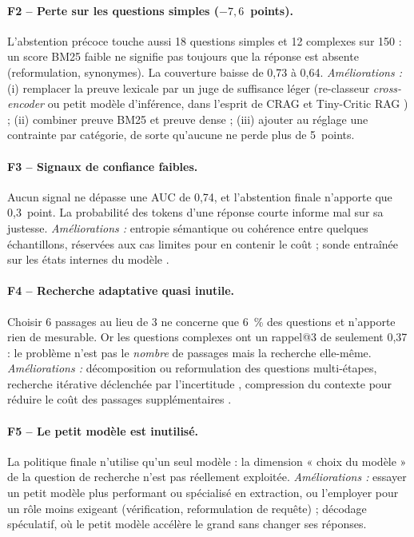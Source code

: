 \documentclass[11pt,a4paper]{article}
\begin{document}
\paragraph{F2 -- Perte sur les questions simples ($-7{,}6$~points).} L'abstention précoce touche aussi
18 questions simples et 12 complexes sur 150 : un score BM25 faible ne signifie pas toujours que la
réponse est absente (reformulation, synonymes). La couverture baisse de 0,73 à 0,64.
\emph{Améliorations :} (i) remplacer la preuve lexicale par un juge de suffisance léger (re-classeur
\emph{cross-encoder} ou petit modèle d'inférence, dans l'esprit de CRAG \citep{yan2024crag} et
Tiny-Critic RAG \citep{wu2026tinycritic}) ; (ii) combiner preuve BM25 et preuve dense ; (iii) ajouter au
réglage une contrainte par catégorie, de sorte qu'aucune ne perde plus de 5~points.

\paragraph{F3 -- Signaux de confiance faibles.} Aucun signal ne dépasse une AUC de 0,74, et l'abstention
finale n'apporte que 0,3~point. La probabilité des tokens d'une réponse courte informe mal sur sa
justesse. \emph{Améliorations :} entropie sémantique \citep{kuhn2023semantic} ou cohérence entre
quelques échantillons, réservées aux cas limites pour en contenir le coût ; sonde entraînée sur les
états internes du modèle \citep{kadavath2022know}.

\paragraph{F4 -- Recherche adaptative quasi inutile.} Choisir 6 passages au lieu de 3 ne concerne que
6~\% des questions et n'apporte rien de mesurable. Or les questions complexes ont un rappel@3 de
seulement 0,37 : le problème n'est pas le \emph{nombre} de passages mais la recherche elle-même.
\emph{Améliorations :} décomposition ou reformulation des questions multi-étapes, recherche itérative
déclenchée par l'incertitude \citep{jiang2023flare,su2024dragin}, compression du contexte pour réduire
le coût des passages supplémentaires \citep{arefeen2024leancontext}.

\paragraph{F5 -- Le petit modèle est inutilisé.} La politique finale n'utilise qu'un seul modèle : la
dimension « choix du modèle » de la question de recherche n'est pas réellement exploitée.
\emph{Améliorations :} essayer un petit modèle plus performant ou spécialisé en extraction, ou l'employer
pour un rôle moins exigeant (vérification, reformulation de requête) ; décodage spéculatif, où le petit
modèle accélère le grand sans changer ses réponses.
\end{document}
